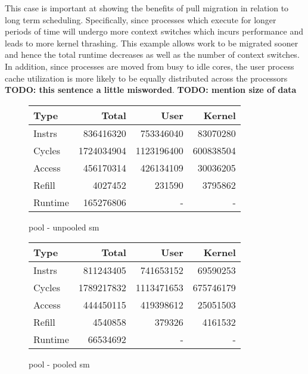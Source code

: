 \documentclass[11pt]{article}
\begin{document}
This case is important at showing the benefits of pull migration in relation to long term scheduling.  Specifically, since processes which execute for longer periods of time will undergo more context switches which incurs performance and leads to more kernel thrashing.  This example allows work to be migrated sooner and hence the total runtime decreases as well as the number of context switches.  In addition, since processes are moved from busy to idle cores, the user process cache utilization is more likely to be equally distributed across the processors \textbf{TODO: this sentence a little misworded}.  \textbf{TODO: mention size of data}

\begin{figure*}[h]
	\centering
	\begin{subtable}{.48\textwidth}
		\centering
		\begin{tabular}{ l|rrr }
			Type    & Total      & User       & Kernel    \\
			\hline
			Instrs  & 836416320  & 753346040  & 83070280  \\ 
			Cycles  & 1724034904 & 1123196400 & 600838504 \\ 
			Access  & 456170314  & 426134109  & 30036205  \\ 
			Refill  & 4027452    & 231590     & 3795862   \\ 
			Runtime & 165276806  & -          & -         \\
			\hline
		\end{tabular}
		\caption{pool - unpooled sm}
	\end{subtable}
	\hfill
	\begin{subtable}{.48\textwidth} 
		\centering
		\begin{tabular}{ l|rrr }
			Type    & Total      & User       & Kernel    \\
			\hline
			Instrs  & 811243405  & 741653152  & 69590253  \\ 
			Cycles  & 1789217832 & 1113471653 & 675746179 \\ 
			Access  & 444450115  & 419398612  & 25051503  \\ 
			Refill  & 4540858    & 379326     & 4161532   \\ 
			Runtime & 66534692   & -          & -         \\
			\hline
		\end{tabular}
		\caption{pool - pooled sm}        
	\end{subtable}
\end{figure*}
\end{document}
